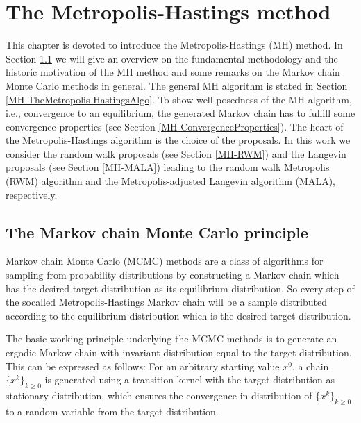 \chapter{The Metropolis-Hastings method}
\label{sec:Metropolis-HastingsMethod}


This chapter is devoted to introduce the Metropolis-Hastings (MH) method. In Section \ref{MH-MCMCPrinciple} we will give an overview on the fundamental methodology and the historic motivation of the MH method and some remarks on the Markov chain Monte Carlo methods in general. The general MH algorithm is stated in Section \ref{MH-TheMetropolis-HastingsAlgo}. To show well-posedness of the MH algorithm, i.e., convergence to an equilibrium, the generated Markov chain has to fulfill some convergence properties (see Section \ref{MH-ConvergenceProperties}). The heart of the Metropolis-Hastings algorithm is the choice of the proposals. In this work we consider the random walk proposals (see Section \ref{MH-RWM}) and the Langevin proposals (see Section \ref{MH-MALA}) leading to the random walk Metropolis (RWM) algorithm and the Metropolis-adjusted Langevin algorithm (MALA), respectively.


\section{The Markov chain Monte Carlo principle}
\label{MH-MCMCPrinciple}

Markov chain Monte Carlo (MCMC) methods are a class of algorithms for sampling from probability distributions by constructing a Markov chain which has the desired target distribution as its equilibrium distribution. So every step of the socalled Metropolis-Hastings Markov chain will be a sample distributed according to the equilibrium distribution which is the desired target distribution.

The basic working principle underlying the MCMC methods is to generate an ergodic Markov chain with invariant distribution equal to the target distribution. This can be expressed as follows: For an arbitrary starting value $x^0$, a chain $ \{ x^{k} \}_{k \geq 0} $ is generated using a transition kernel with the target distribution as stationary distribution, which ensures the convergence in distribution of $ \{ x^{k} \}_{k \geq 0} $ to a random variable from the target distribution.

